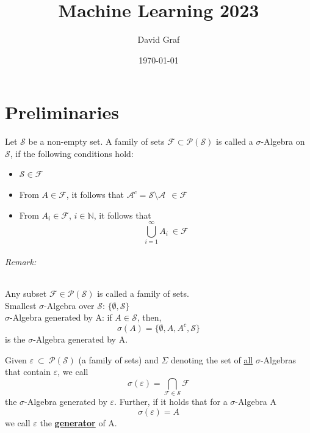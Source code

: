 \documentclass[10pt,a4paper]{article}
\title{Machine Learning 2023}
\author{David Graf}
\date{\today}
\theoremstyle{definition}
\theoremstyle{plain}
\begin{document}
\maketitle
\part{Preliminaries}
\begin{boxeddef}
	Let $\mathcal{S}$ be a non-empty set. A family of sets $\mathcal{F} \subset \mathcal{P}(\mathcal{S})$ is called a $\sigma$-Algebra on $\mathcal{S}$, if the following conditions hold:
	\begin{itemize}
		\item $\mathcal{S} \in \mathcal{F}$
		\item From $ A \in \mathcal{F}$, it follows that $\mathcal{A}^c = \mathcal{S} \setminus \mathcal{A} \ \ \in \mathcal{F}$
		\item From $ A_i \in \mathcal{F}$, $i \in \mathbb{N}$, it follows that $$
			\bigcup_{i=1}^{\infty} A_i \  \in \mathcal{F}$$
	\end{itemize}
\end{boxeddef}

\paragraph{Remark:} Any subset $\mathcal{F} \in \mathcal{P}(\mathcal{S})$ is called a family of sets.\\

Smallest $\sigma$-Algebra over $\mathcal{S}$: $\{\emptyset, \mathcal{S}\}$\\

$\sigma$-Algebra generated by A: if $A \in \mathcal{S}$, then,$$
\sigma(A) = \{\emptyset, A, A^c, \mathcal{S}\}
$$
is the $\sigma$-Algebra generated by A.\\

\begin{boxeddef}[Generator]
	\label{generator}
	Given $\varepsilon \ \subset \ \mathcal{P}(\mathcal{S})$ (a family of sets) and $\Sigma$ denoting the set of \underline{all} $\sigma$-Algebras that contain $\varepsilon$, we call\\
	$$\sigma(\varepsilon) = \bigcap_{\mathcal{F} \in \mathcal{S}} \mathcal{F}$$
	the $\sigma$-Algebra generated by $\varepsilon$. Further, if it holds that for a $\sigma$-Algebra A\\
	$$\sigma(\varepsilon) = A$$
	we call $\varepsilon$ the \underline{\textbf{generator}} of A.	
\end{boxeddef}
\end{document}

